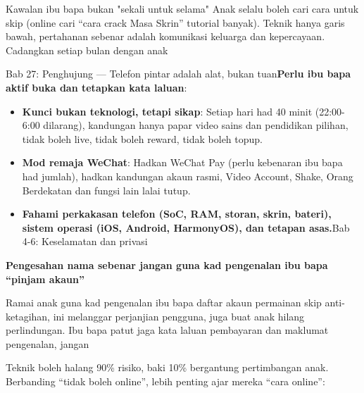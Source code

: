\begin{tcbwarn}{Kawalan ibu bapa bukan "sekali untuk selama"}
Anak selalu boleh cari cara untuk skip (online cari “cara crack Masa Skrin” tutorial banyak). Teknik hanya garis bawah, pertahanan sebenar adalah komunikasi keluarga dan kepercayaan. Cadangkan setiap bulan dengan anak

\end{tcbwarn}


Bab 27: Penghujung — Telefon pintar adalah alat, bukan tuan\textbf{Perlu ibu bapa aktif buka dan tetapkan kata laluan}:

\begin{itemize}
  \item \textbf{Kunci bukan teknologi, tetapi sikap}: Setiap hari had 40 minit (22:00-6:00 dilarang), kandungan hanya papar video sains dan pendidikan pilihan, tidak boleh live, tidak boleh reward, tidak boleh topup.
  \item \textbf{Mod remaja WeChat}: Hadkan WeChat Pay (perlu kebenaran ibu bapa had jumlah), hadkan kandungan akaun rasmi, Video Account, Shake, Orang Berdekatan dan fungsi lain lalai tutup.
  \item \textbf{Fahami perkakasan telefon (SoC, RAM, storan, skrin, bateri), sistem operasi (iOS, Android, HarmonyOS), dan tetapan asas.}Bab 4-6: Keselamatan dan privasi
\end{itemize}

\textbf{Pengesahan nama sebenar jangan guna kad pengenalan ibu bapa “pinjam akaun”}\par

Ramai anak guna kad pengenalan ibu bapa daftar akaun permainan skip anti-ketagihan, ini melanggar perjanjian pengguna, juga buat anak hilang perlindungan. Ibu bapa patut jaga kata laluan pembayaran dan maklumat pengenalan, jangan


Teknik boleh halang 90\% risiko, baki 10\% bergantung pertimbangan anak. Berbanding “tidak boleh online”, lebih penting ajar mereka “cara online”:

